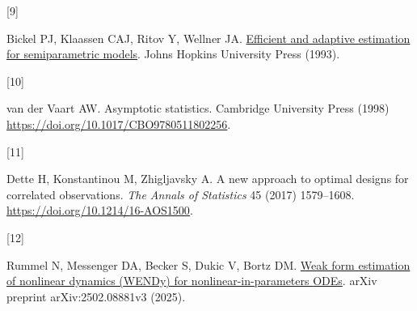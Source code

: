 \documentclass[
  american,
  11pt,
]{article}
\newlength{\cslhangindent}
\newlength{\csllabelwidth}
\newenvironment{CSLReferences}[2] %
 {\begin{list}{}{%
  \setlength{\itemindent}{0pt}
  \setlength{\leftmargin}{0pt}
  \setlength{\parsep}{0pt}
  \ifodd #1
   \setlength{\leftmargin}{\cslhangindent}
   \setlength{\itemindent}{-1\cslhangindent}
  \fi
  \setlength{\itemsep}{#2\baselineskip}}}
 {\end{list}}
\newcommand{\CSLLeftMargin}[1]{\parbox[t]{\csllabelwidth}{\strut#1\strut}}
\newcommand{\CSLRightInline}[1]{\parbox[t]{\linewidth - \csllabelwidth}{\strut#1\strut}}
\begin{document}
\begin{CSLReferences}{0}{0}
\CSLLeftMargin{{[}9{]} }%
\CSLRightInline{Bickel PJ, Klaassen CAJ, Ritov Y, Wellner JA.
\href{https://faculty.washington.edu/jonw/RESEARCH/BOOKS/book3.html}{Efficient
and adaptive estimation for semiparametric models}. Johns Hopkins
University Press (1993).}

\CSLLeftMargin{{[}10{]} }%
\CSLRightInline{{van der Vaart AW}. Asymptotic statistics. Cambridge
University Press (1998) \url{https://doi.org/10.1017/CBO9780511802256}.}

\CSLLeftMargin{{[}11{]} }%
\CSLRightInline{Dette H, Konstantinou M, Zhigljavsky A. A new approach
to optimal designs for correlated observations. \emph{The Annals of
Statistics} 45 (2017) 1579--1608.
\url{https://doi.org/10.1214/16-AOS1500}.}

\CSLLeftMargin{{[}12{]} }%
\CSLRightInline{Rummel N, Messenger DA, Becker S, Dukic V, Bortz DM.
\href{https://arxiv.org/abs/2502.08881v3}{Weak form estimation of
nonlinear dynamics ({WENDy}) for nonlinear-in-parameters {ODEs}}. arXiv
preprint arXiv:2502.08881v3 (2025).}

\end{CSLReferences}
\end{document}
